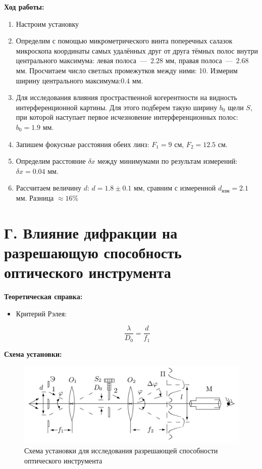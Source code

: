 \documentclass[a4paper, 12pt]{article}
\begin{document}
\textbf{Ход работы:}

\begin{enumerate}
    \item Настроим установку
    \item Определим с помощью микрометрического винта поперечных салазок микроскопа координаты самых удалённых друг от друга тёмных полос внутри центрального максимума: левая полоса~---~$2.28$ мм, правая полоса~---~$2.68$ мм. Просчитаем число светлых промежутков между ними: 10. Измерим ширину центрального максимума:$0.4$ мм.
    \item Для исследования влияния простраственной когерентности на видность интерференционной картины. Для этого подберем такую ширину $b_0$ щели $S$, при которой наступает первое исчезновение интерференционных полос: $b_0 = 1.9$ мм.
    \item Запишем фокусные расстояния обеих линз: $F_1 = 9$ см, $F_2 = 12.5$ см.
    \item Определим расстояние $\delta x$ между минимумами по результам измерений: $\delta x = 0.04$ мм. 
    \item Рассчитаем величину $d$: $d = 1.8 \pm 0.1$ мм, сравним с измеренной $d_{изм} = 2.1$ мм. Разница $\approx 16 \%$
\end{enumerate}

\section*{Г. Влияние дифракции на разрешающую способность оптического инструмента}

\textbf{Теоретическая справка:}

\begin{itemize}
    \item Критерий Рэлея:
    
    \begin{equation*}
        \dfrac{\lambda}{D_0} = \dfrac{d}{f_1}
    \end{equation*}
\end{itemize}

\newpage

\textbf{Схема установки:}

\begin{figure}[!h]
    \centering
    \includegraphics[scale=0.3]{pic4.png}
    \caption{Схема установки для исследования разрешающей способности оптического инструмента}
    \label{pic4}
\end{figure}
\end{document}
